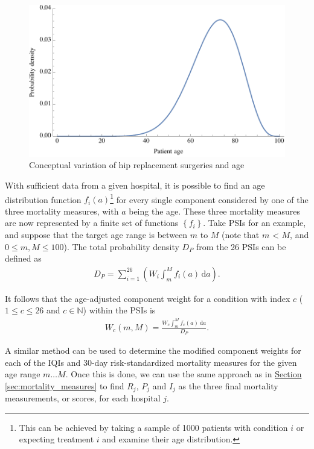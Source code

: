 \documentclass{article}
\begin{document}
\begin{figure}[htbp]
    \centering
    \includegraphics[scale=0.7]{hip_replacement.pdf}
    \caption{Conceptual variation of hip replacement surgeries and age}
    \label{fig:hip_replacement}
\end{figure}

With sufficient data from a given hospital, it is possible to find an age distribution function $f_i\left(a\right)$\footnote{This can be achieved by taking a sample of 1000 patients with condition $i$ or expecting treatment $i$ and examine their age distribution.} for every single component considered by one of the three mortality measures, with $a$ being the age. These three mortality measures are now represented by a finite set of functions $\left\{f_i\right\}$. Take PSIs for an example, and suppose that the target age range is between $m$ to $M$ (note that $m$ < $M$, and $0 \le m, M \le 100$). The total probability density $D_P$ from the 26 PSIs can be defined as 
\begin{gather}D_P = \sum_{i=1}^{26}\left(W_i\int_m^M \! f_i\left(a\right)\, \mathrm{d}a\right).\end{gather}

It follows that the age-adjusted component weight for a condition with index $c$ ($1 \le c \le 26$ and $c \in \mathbb{N}$) within the PSIs is 
\begin{gather}W_c\left(m, M\right) = \frac{\displaystyle W_c \int_m^M \! f_c\left(a\right)\,\mathrm{d}a}{D_P}.\end{gather}

A similar method can be used to determine the modified component weights for each of the IQIs and 30-day risk-standardized mortality measures for the given age range $m\dots M$. Once this is done, we can use the same approach as in \hyperref[sec:mortality_measures]{Section \ref*{sec:mortality_measures}} to find $R_j$, $P_j$ and $I_j$ as the three final mortality measurements, or scores, for each hospital $j$.
\end{document}
